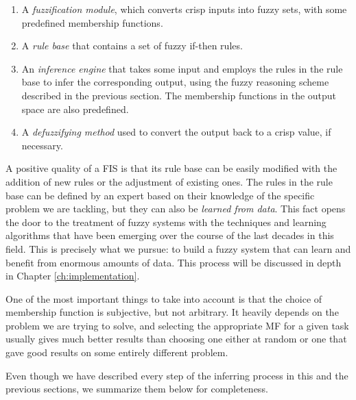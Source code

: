 \begin{enumerate}[1.]
  \item A \textit{fuzzification module}, which converts crisp inputs into fuzzy sets, with some predefined membership functions.
  \item A \textit{rule base} that contains a set of fuzzy if-then rules.
  \item An \textit{inference engine} that takes some input and employs the rules in the rule base to infer the corresponding output, using the fuzzy reasoning scheme described in the previous section. The membership functions in the output space are also predefined.
  \item A \textit{defuzzifying method} used to convert the output back to a crisp value, if necessary.
\end{enumerate}

A positive quality of a FIS is that its rule base can be easily modified with the addition of new rules or the adjustment of existing ones. The rules in the rule base can be defined by an expert based on their knowledge of the specific problem we are tackling, but they can also be \textit{learned from data}. This fact opens the door to the treatment of fuzzy systems with the techniques and learning algorithms that have been emerging over the course of the last decades in this field. This is precisely what we pursue: to build a fuzzy system that can learn and benefit from enormous amounts of data. This process will be discussed in depth in Chapter \ref{ch:implementation}.

One of the most important things to take into account is that the choice of membership function is subjective, but not arbitrary. It heavily depends on the problem we are trying to solve, and selecting the appropriate MF for a given task usually gives much better results than choosing one either at random or one that gave good results on some entirely different problem.

Even though we have described every step of the inferring process in this and the previous sections, we summarize them below for completeness.

